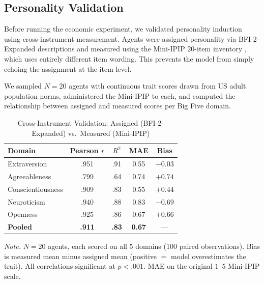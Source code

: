 \documentclass[12pt, a4paper]{article}
\begin{document}
\subsection{Personality Validation}
\label{sec:validation}

Before running the economic experiment, we validated personality induction using cross-instrument measurement. Agents were assigned personality via BFI-2-Expanded descriptions and measured using the Mini-IPIP $20$-item inventory \citep{donnellan2006mini}, which uses entirely different item wording. This prevents the model from simply echoing the assignment at the item level.

We sampled $N = 20$ agents with continuous trait scores drawn from US adult population norms, administered the Mini-IPIP to each, and computed the relationship between assigned and measured scores per Big Five domain.

\begin{table}[H]
\centering
\caption{Cross-Instrument Validation: Assigned (BFI-2-Expanded) vs.\ Measured (Mini-IPIP)}
\label{tab:validation}
\begin{tabular}{lcccc}
\toprule
Domain & Pearson $r$ & $R^2$ & MAE & Bias \\
\midrule
Extraversion      & .951 & .91 & 0.55 & $-0.03$ \\
Agreeableness     & .799 & .64 & 0.74 & $+0.74$ \\
Conscientiousness & .909 & .83 & 0.55 & $+0.44$ \\
Neuroticism       & .940 & .88 & 0.83 & $-0.69$ \\
Openness          & .925 & .86 & 0.67 & $+0.66$ \\
\midrule
\textbf{Pooled}   & \textbf{.911} & \textbf{.83} & \textbf{0.67} & --- \\
\bottomrule
\end{tabular}

\medskip
\footnotesize
\textit{Note.} $N = 20$ agents, each scored on all $5$ domains ($100$ paired observations). Bias is measured mean minus assigned mean (positive $=$ model overestimates the trait). All correlations significant at $p < .001$. MAE on the original $1$--$5$ Mini-IPIP scale.
\end{table}
\end{document}
